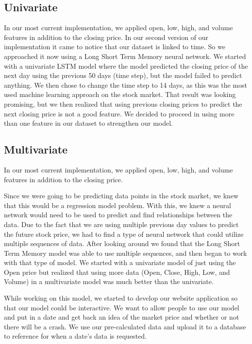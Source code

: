 \documentclass{article}
\begin{document}
\subsection{Univariate}
In our most current implementation, we applied open, low, high, and volume features in addition to the closing price.
In our second version of our implementation it came to notice that our dataset is linked to time. So we approached it now using a Long Short Term Memory neural network. We started with a univariate LSTM model where the model predicted the closing price of the next day using the previous 50 days (time step), but the model failed to predict anything. We then chose to change the time step to 14 days, as this was the most used machine learning approach on the stock market. That result was looking promising, but we then realized that using previous closing prices to predict the next closing price is not a good feature. We decided to proceed in using more than one feature in our dataset to strengthen our model. 

\subsection{Multivariate}
In our most current implementation, we applied open, low, high, and volume features in addition to the closing price.

Since we were going to be predicting data points in the stock market, we knew that this would be a regression model problem. With this, we knew a neural network would need to be used to predict and find relationships between the data. Due to the fact that we are using multiple previous day values to predict the future stock price, we had to find a type of neural network that could utilize multiple sequences of data. After looking around we found that the Long Short Term Memory model was able to use multiple sequences, and then began to work with that type of model. We started with a univariate model of just using the Open price but realized that using more data (Open, Close, High, Low, and Volume) in a multivariate model was much better than the univariate.

While working on this model, we started to develop our website application so that our model could be interactive. We want to allow people to use our model and put in a date and get back an idea of the market price and whether or not there will be a crash. We use our pre-calculated data and upload it to a database to reference for when a date's data is requested.
\end{document}
